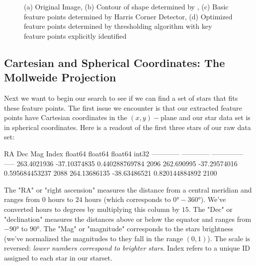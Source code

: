 \documentclass[paper=a4, fontsize=11pt]{scrartcl} %
\begin{document}
\begin{figure}
\caption{(a) Original Image, (b) Contour of shape determined by \cite{Suzuki1985}, (c) Basic feature points determined by Harris Corner Detector, (d) Optimized feature points determined by thresholding algorithm with key feature points explicitly identified}
\label{feat_detect}
\end{figure}


\subsection{Cartesian and Spherical Coordinates: The Mollweide Projection}
Next we want to begin our search to see if we can find a set of stars that fits these feature points. The first issue we encounter is that our extracted feature points have Cartesian coordinates in the $(x,y)-$plane and our star data set is in spherical coordinates. Here is a readout of the first three stars of our raw data set:
\begin{python}
     RA          Dec           Mag       Index
  float64      float64       float64     int32
------------ ------------ -------------- -----
 263.4021936 -37.10374835 0.440288769784  2096
  262.690995 -37.29574016 0.595684453237  2088
264.13686135 -38.63486521 0.820144884892  2100

\end{python}
The "RA" or "right ascension" measures the distance from a central meridian and ranges from $0$ hours to $24$ hours (which corresponds to $0\si{\degree}-360\si{\degree}$). We've converted hours to degrees by multiplying this column by $15$.
The "Dec" or "declination" measures the distances above or below the equator and ranges from $-90\si{\degree}$ to $90\si{\degree}$. The "Mag" or "magnitude" corresponds to the stars brightness (we've normalized the magnitudes to they fall in the range $(0,1)$). The scale is reversed: \textit{lower numbers correspond to brighter stars}.
Index refers to a unique ID assigned to each star in our starset.
\end{document}
